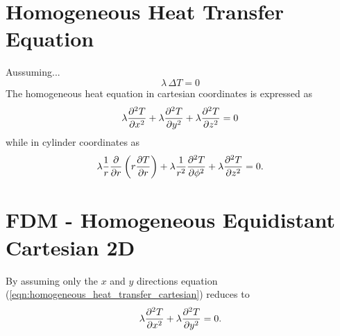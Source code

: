 \section{Homogeneous Heat Transfer Equation}
Aussuming...
\begin{equation}
\label{eqn:homogeneous_heat_transfer}
    \lambda \, \Delta T  = 0
\end{equation}
The homogeneous heat equation in cartesian coordinates is expressed as
\begin{equation}
\label{eqn:homogeneous_heat_transfer_cartesian}
    \lambda\pdv[2]{T}{x} + \lambda\pdv[2]{T}{y} + \lambda\pdv[2]{T}{z} = 0
\end{equation}
while in cylinder coordinates as
\begin{equation}
\label{eqn:homogeneous_heat_transfer_cylinder}
    \lambda\frac{1}{r}\pdv{}{r}\left(r \pdv{T}{r}\right) + \lambda\frac{1}{r^2}\pdv[2]{T}{\phi} + \lambda\pdv[2]{T}{z} = 0.
\end{equation}

\section{FDM - Homogeneous Equidistant Cartesian 2D}
By assuming only the $x$ and $y$ directions equation (\ref{eqn:homogeneous_heat_transfer_cartesian}) reduces to
\begin{equation}
  \label{eqn:fdm_equi_cart_2d}
  \lambda\pdv[2]{T}{x} + \lambda\pdv[2]{T}{y} = 0.
\end{equation}

